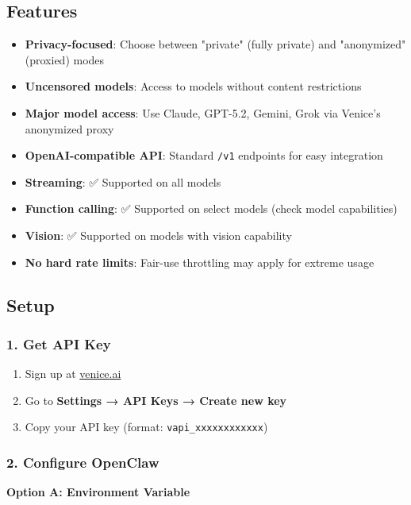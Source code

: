 \subsection{Features}


\begin{itemize}
  \item \textbf{Privacy-focused}: Choose between "private" (fully private) and "anonymized" (proxied) modes
  \item \textbf{Uncensored models}: Access to models without content restrictions
  \item \textbf{Major model access}: Use Claude, GPT-5.2, Gemini, Grok via Venice's anonymized proxy
  \item \textbf{OpenAI-compatible API}: Standard \texttt{/v1} endpoints for easy integration
  \item \textbf{Streaming}: ✅ Supported on all models
  \item \textbf{Function calling}: ✅ Supported on select models (check model capabilities)
  \item \textbf{Vision}: ✅ Supported on models with vision capability
  \item \textbf{No hard rate limits}: Fair-use throttling may apply for extreme usage
\end{itemize}


\subsection{Setup}


\subsubsection{1. Get API Key}


\begin{enumerate}
  \item Sign up at \href{https://venice.ai}{venice.ai}
  \item Go to \textbf{Settings → API Keys → Create new key}
  \item Copy your API key (format: \texttt{vapi\_xxxxxxxxxxxx})
\end{enumerate}


\subsubsection{2. Configure OpenClaw}


\textbf{Option A: Environment Variable}


